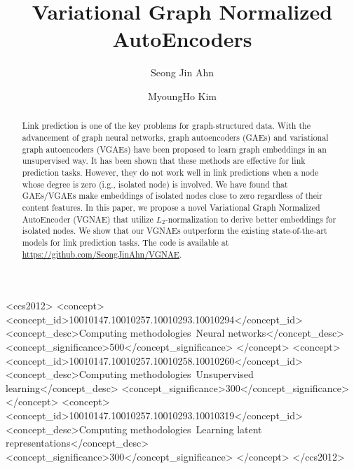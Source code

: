 \documentclass[sigconf]{acmart}
\begin{document}
\title{Variational Graph Normalized AutoEncoders}

\author{Seong Jin Ahn}

\author{MyoungHo Kim}


\renewcommand{\shortauthors}{Short Paper Track}

\begin{abstract}
Link prediction is one of the key problems for graph-structured data.
With the advancement of graph neural networks, graph autoencoders (GAEs) and variational graph autoencoders (VGAEs) have been proposed to learn graph embeddings in an unsupervised way.
It has been shown that these methods are effective for link prediction tasks.
However, they do not work well in link predictions when a node whose degree is zero (i.g., isolated node) is involved.
We have found that GAEs/VGAEs make embeddings of isolated nodes close to zero regardless of their content features.
In this paper, we propose a novel Variational Graph Normalized AutoEncoder (VGNAE) that utilize $L_2$-normalization to derive better embeddings for isolated nodes.
We show that our VGNAEs outperform the existing state-of-the-art models for link prediction tasks.
The code is available at \hyperlink{https://github.com/SeongJinAhn/VGNAE}{https://github.com/SeongJinAhn/VGNAE}.
\end{abstract}



\begin{CCSXML}
<ccs2012>
   <concept>
       <concept_id>10010147.10010257.10010293.10010294</concept_id>
       <concept_desc>Computing methodologies~Neural networks</concept_desc>
       <concept_significance>500</concept_significance>
       </concept>
   <concept>
       <concept_id>10010147.10010257.10010258.10010260</concept_id>
       <concept_desc>Computing methodologies~Unsupervised learning</concept_desc>
       <concept_significance>300</concept_significance>
       </concept>
   <concept>
       <concept_id>10010147.10010257.10010293.10010319</concept_id>
       <concept_desc>Computing methodologies~Learning latent representations</concept_desc>
       <concept_significance>300</concept_significance>
       </concept>
 </ccs2012>
\end{CCSXML}

\end{document}
